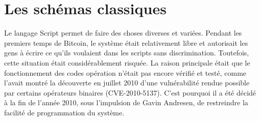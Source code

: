 %
%
%
%
%
%
%


\section*{Les schémas classiques}


Le langage Script permet de faire des choses diverses et variées. Pendant les premiers temps de Bitcoin, le système était relativement libre et autorisait les gens à écrire ce qu'ils voulaient dans les scripts sans discrimination. Toutefois, cette situation était considérablement risquée. La raison principale était que le fonctionnement des codes opération n'était pas encore vérifié et testé, comme l'avait montré la découverte en juillet 2010 d'une vulnérabilité rendue possible par certains opérateurs binaires (CVE-2010-5137). C'est pourquoi il a été décidé à la fin de l'année 2010, sous l'impulsion de Gavin Andresen, de restreindre la facilité de programmation du système.

